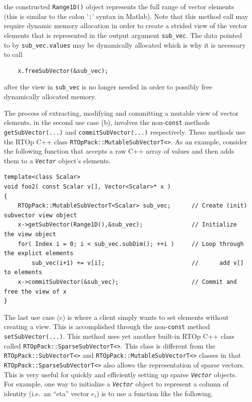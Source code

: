 \noindent the constructed \texttt{Range1D()} object represents the full range of
vector elements (this is similar to the colon '\texttt{:}' syntax
in Matlab).  Note that this method call may require dynamic memory
allocation in order to create a strided view of the vector elements
that is represented in the output argument \texttt{sub\_vec}.  The
data pointed to by \texttt{sub\_vec.values} may be dynamically
allocated which is why it is necessary to call

{\scriptsize\begin{verbatim}
    x.freeSubVector(&sub_vec);
\end{verbatim}}

\noindent after the view in \texttt{sub\_vec} is no longer needed in order to possibly
free dynamically allocated memory.

The process of extracting, modifying and committing a mutable view of
vector elements, in the second use case (b), involves the
non-\texttt{const} methods \texttt{getSubVector(...)} and
\texttt{commit\-Sub\-Vector(...)} respectively.  These methods use the
RTOp C++ class \texttt{RTOpPack::\-Mutable\-Sub\-VectorT<>}.  As an
example, consider the following function that accepts a raw C++ array
of values and then adds them to a \texttt{\textit{Vector}} object's
elements.

{\scriptsize\begin{verbatim}
template<class Scalar>
void foo2( const Scalar v[], Vector<Scalar>* x )
{
    RTOpPack::MutableSubVectorT<Scalar> sub_vec;      // Create (init) subvector view object
    x->getSubVector(Range1D(),&sub_vec);              // Initialize the view object
    for( Index i = 0; i < sub_vec.subDim(); ++i )     // Loop through the explict elements
        sub_vec(i+1) += v[i];                         //      add v[] to elements
    x->commitSubVector(&sub_vec);                     // Commit and free the view of x
}
\end{verbatim}}

The last use case (c) is where a client simply wants to set elements
without creating a view.  This is accomplished through the
non-\texttt{const} method \texttt{set\-Sub\-Vector(...)}.  This method
uses yet another built-in RTOp C++ class called
\texttt{RTOpPack::\-Sparse\-Sub\-VectorT<>}.  This class is different from the
\texttt{RTOpPack::\-SubVectorT<>} and
\texttt{RTOpPack::\-Mutable\-Sub\-VectorT<>} classes in that
\texttt{RTOpPack::\-Sparse\-Sub\-VectorT<>} also allows the representation of 
sparse vectors.  This is very useful for quickly and efficiently
setting up sparse \texttt{\textit{Vector}} objects.  For example, one
way to initialize a \texttt{\textit{Vector}} object to represent a
column of identity (i.e.~an ``eta'' vector $e_i$) is to use a function
like the following.

